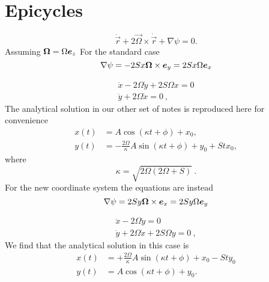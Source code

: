 \documentclass[aps,pre,notitlepage,amsmath,amssymb,amsfonts,nobibnotes,nofootinbib,superscriptaddress,onecolumn,a4paper,10pt]{revtex4-1}
\begin{document}
\section{Epicycles}
\begin{equation}
  \ddot{\vec{r}} + 2\vec{\Omega}\times\dot{\vec{r}} + \nabla\psi = 0.
\end{equation}
Assuming $\bm{\Omega} = \Omega \bm{e}_z$
For the standard case
\begin{equation}
\nabla \psi = -2Sx\bm{\Omega}\times \bm{e}_y = 2Sx\Omega \bm{e}_x
\end{equation}

\begin{align}
  \ddot{x} - 2 \Omega \dot{y} + 2 S \Omega x = 0 \\
  \ddot{y} + 2 \Omega \dot{x} = 0 \ ,
\end{align}
The analytical solution in our other set of notes is reproduced here for
convenience
\begin{align}
  x(t) &= A\cos(\kappa t + \phi) + x_0, \\
  y(t) &= -\frac{2\Omega}{\kappa} A\sin(\kappa t + \phi) + y_0 + S t x_0,
\end{align}
where
\begin{equation}
  \kappa = \sqrt{2\Omega(2\Omega + S)} \ .
\end{equation}
For the new coordinate system the equations are instead
\begin{equation}
\nabla \psi = 2Sy\bm{\Omega} \times \bm{e}_x = 2Sy \Omega\bm{e}_y
\end{equation}

\begin{align}
  \ddot{x} - 2 \Omega \dot{y} = 0 \\
  \ddot{y} + 2 \Omega \dot{x} + 2 S \Omega y = 0 \ ,
\end{align}
We find that the analytical solution in this case is
\begin{align}
  x(t) &= +\frac{2\Omega}{\kappa} A\sin(\kappa t + \phi) + x_0 - S t y_0 \\
  y(t) &= A\cos(\kappa t + \phi) + y_0.
\end{align}
\end{document}

